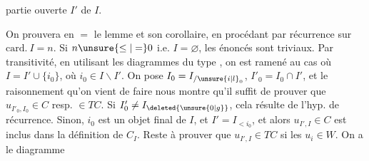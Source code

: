 
partie ouverte $I'$ de $I$. 

On prouvera en $=$  le lemme et son corollaire, en procédant par récurrence sur $\mathrm{card}.\ I=n$. Si $n\unsure{\leq|=}0$ i.e. $I=\varnothing$, les énoncés sont triviaux. Par transitivité, en utilisant les diagrammes du type , on est ramené au cas où $I=I'\cup\{i_0\}$, où $i_0\in I\smallsetminus I'$. On pose  $I_0=I_{/\unsure{i|l}_0}$, $I'_0=I_0\cap I'$, et le raisonnement qu’on vient de faire nous montre qu’il suffit de prouver que $u_{I'_0,I_0}\in C$ resp. $\in TC$. Si $I'_0\ne I_{\deleted{\unsure{0|g}}}$, cela résulte de l’hyp. de récurrence. Sinon, $i_0$ est un objet final de $I$, et $I'=I_{<i_0}$, et alors $u_{I',I}\in C$  est inclus dans la définition de $C_I$.  Reste à prouver  que $u_{I',I}\in TC$ si les $u_i\in W$. On a le diagramme


